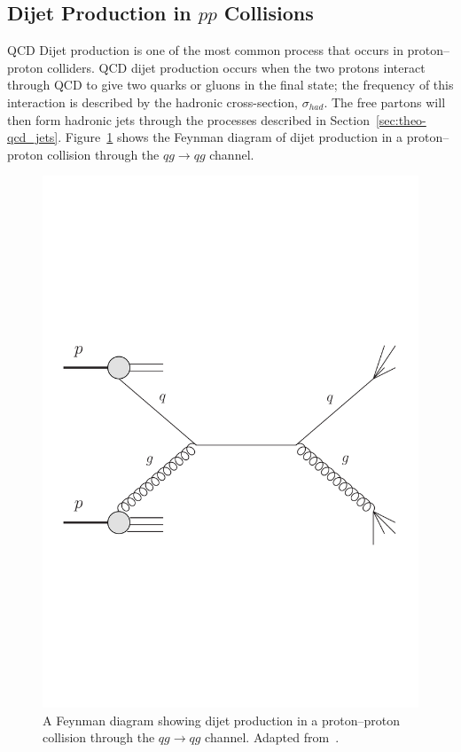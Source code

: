
\subsection{Dijet Production in $pp$ Collisions}
\label{sec:theo-qcd_dijet}

QCD Dijet production is one of the most common process that occurs in proton--proton colliders.
QCD dijet production occurs when the two protons interact through QCD to give two quarks or gluons in the final state;
the frequency of this interaction is described by the hadronic cross-section, $\sigma_{had}$.
The free partons will then form hadronic jets through the processes described in Section~\ref{sec:theo-qcd_jets}.
Figure~\ref{fig:theo-qcd_dijet_feynman} shows the Feynman diagram of
dijet production in a proton--proton collision through the $qg \to qg$ channel.

\begin{figure}[!hbt]
  \begin{center}
    \includegraphics[width=0.6\linewidth, angle=0]{figs/Theory/qcd_dijet_feynman.pdf}
  \end{center}
  \vspace{-1em}
  \caption[A Feynman diagram showing dijet production in a proton--proton collision through the $qg \to qg$ channel.]
          {A Feynman diagram showing dijet production in a proton--proton collision through the $qg \to qg$ channel. Adapted from~\cite{theo-qcd_dijet_feynman}.}
          \label{fig:theo-qcd_dijet_feynman}
\end{figure}

